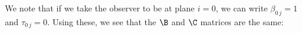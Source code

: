 We note that if we take the observer to be at plane $i =0$, we can write $\beta_{0\,j} = 1$ and $\tau_{0\,j} = 0$. Using these, we see that the $\B$ and $\C$ matrices are the same:
